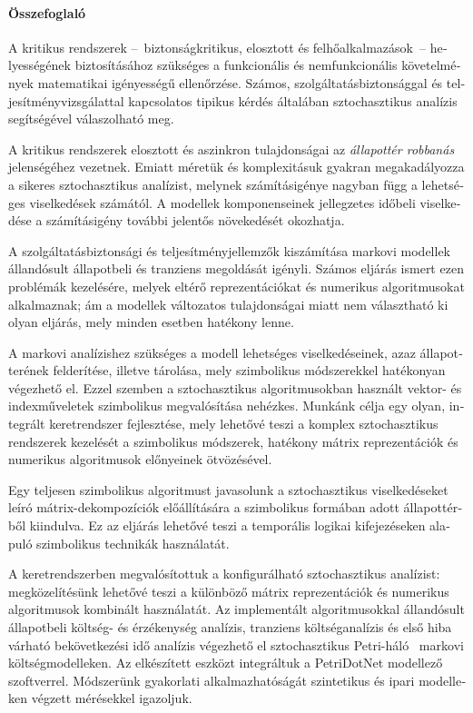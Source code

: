 \begin{otherlanguage}{magyar}

  \thispagestyle{plain}
  \paragraph*{Összefoglaló}

  A kritikus rendszerek --~biztonságkritikus,
  elosztott és felhőalkalmazások~-- helyességének
  biztosításához szükséges a funkcionális és nemfunkcionális
  követelmények matematikai igényességű ellenőrzése. Számos,
  szolgáltatásbiztonsággal és teljesítményvizsgálattal kapcsolatos
  tipikus kérdés általában sztochasztikus analízis segítségével
  válaszolható meg.

  A kritikus rendszerek elosztott és aszinkron tulajdonságai az
  \emph{állapottér robbanás} jelenségéhez vezetnek. Emiatt méretük és
  komplexitásuk gyakran megakadályozza a sikeres sztochasztikus
  analízist, melynek számításigénye nagyban függ a lehetséges
  viselkedések számától. A modellek komponenseinek jellegzetes időbeli
  viselkedése a számításigény további jelentős növekedését okozhatja.

  A szolgáltatásbiztonsági és teljesítményjellemzők kiszámítása
  markovi modellek állandósult állapotbeli és tranziens megoldását
  igényli. Számos eljárás ismert ezen problémák kezelésére, melyek
  eltérő reprezentációkat és numerikus algoritmusokat alkalmaznak; ám
  a modellek változatos tulajdonságai miatt nem választható ki olyan
  eljárás, mely minden esetben hatékony lenne.

  A markovi analízishez szükséges a modell lehetséges viselkedéseinek,
  azaz állapotterének felderítése, illetve tárolása, mely szimbolikus
  módszerekkel hatékonyan végezhető el. Ezzel szemben a sztochasztikus
  algoritmusokban használt vektor- és indexműveletek szimbolikus
  megvalósítása nehézkes. Munkánk célja egy olyan, integrált
  keretrendszer fejlesztése, mely lehetővé teszi a komplex
  sztochasztikus rendszerek kezelését a szimbolikus módszerek,
  hatékony mátrix reprezentációk és numerikus algoritmusok előnyeinek
  ötvözésével.

  Egy teljesen szimbolikus algoritmust javasolunk a sztochasztikus
  viselkedéseket leíró mátrix-dekompozíciók előállítására a
  szimbolikus formában adott állapottérből kiindulva. Ez az eljárás
  lehetővé teszi a temporális logikai kifejezéseken alapuló
  szimbolikus technikák használatát.

  A keretrendszerben megvalósítottuk a konfigurálható sztochasztikus
  analízist: megközelítésünk lehetővé teszi a különböző
  mátrix reprezentációk és numerikus algoritmusok kombinált
  használatát. Az implementált algoritmusokkal állandósult állapotbeli
  költség- és érzékenység analízis, tranziens költséganalízis és első
  hiba várható bekövetkezési idő analízis végezhető el sztochasztikus
  Petri-háló~ markovi költségmodelleken. Az
  elkészített eszközt integráltuk a PetriDotNet modellező
  szoftverrel. Módszerünk gyakorlati alkalmazhatóságát szintetikus és
  ipari modelleken végzett mérésekkel igazoljuk.

\end{otherlanguage}

